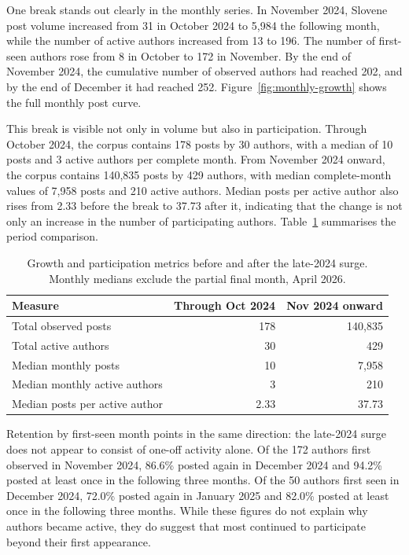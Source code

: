 One break stands out clearly in the monthly series. In November 2024, Slovene post volume increased from 31 in October 2024 to 5,984 the following month, while the number of active authors increased from 13 to 196. The number of first-seen authors rose from 8 in October to 172 in November. By the end of November 2024, the cumulative number of observed authors had reached 202, and by the end of December it had reached 252. Figure~\ref{fig:monthly-growth} shows the full monthly post curve.

This break is visible not only in volume but also in participation. Through October 2024, the corpus contains 178 posts by 30 authors, with a median of 10 posts and 3 active authors per complete month. From November 2024 onward, the corpus contains 140,835 posts by 429 authors, with median complete-month values of 7,958 posts and 210 active authors. Median posts per active author also rises from 2.33 before the break to 37.73 after it, indicating that the change is not only an increase in the number of participating authors. Table~\ref{tab:community-periods} summarises the period comparison.

\begin{table}[htbp]
\caption{Growth and participation metrics before and after the late-2024 surge. Monthly medians exclude the partial final month, April 2026.}
\label{tab:community-periods}
\centering
\begin{tabularx}{\linewidth}{Xrr}
\toprule
Measure & Through Oct 2024 & Nov 2024 onward \\
\midrule
Total observed posts & 178 & 140,835 \\
Total active authors & 30 & 429 \\
Median monthly posts & 10 & 7,958 \\
Median monthly active authors & 3 & 210 \\
Median posts per active author & 2.33 & 37.73 \\
\bottomrule
\end{tabularx}
\end{table}

Retention by first-seen month points in the same direction: the late-2024 surge does not appear to consist of one-off activity alone. Of the 172 authors first observed in November 2024, 86.6\% posted again in December 2024 and 94.2\% posted at least once in the following three months. Of the 50 authors first seen in December 2024, 72.0\% posted again in January 2025 and 82.0\% posted at least once in the following three months. While these figures do not explain why authors became active, they do suggest that most continued to participate beyond their first appearance.

